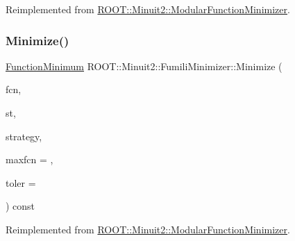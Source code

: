 Reimplemented from \mbox{\hyperlink{classROOT_1_1Minuit2_1_1ModularFunctionMinimizer_a1ae6ed90bc87c3db98388f3d26980a51}{R\+O\+O\+T\+::\+Minuit2\+::\+Modular\+Function\+Minimizer}}.

\mbox{\label{classROOT_1_1Minuit2_1_1FumiliMinimizer_a3da0ec7b2ba7f876809f72d2f3054eec}} 
\subsubsection{\texorpdfstring{Minimize()}{Minimize()}\hspace{0.1cm}{\footnotesize\ttfamily [2/22]}}
{\footnotesize\ttfamily \mbox{\hyperlink{classROOT_1_1Minuit2_1_1FunctionMinimum}{Function\+Minimum}} R\+O\+O\+T\+::\+Minuit2\+::\+Fumili\+Minimizer\+::\+Minimize (\begin{DoxyParamCaption}\item[{const \mbox{\hyperlink{classROOT_1_1Minuit2_1_1FCNBase}{F\+C\+N\+Base}} \&}]{fcn,  }\item[{const \mbox{\hyperlink{classROOT_1_1Minuit2_1_1MnUserParameterState}{Mn\+User\+Parameter\+State}} \&}]{st,  }\item[{const \mbox{\hyperlink{classROOT_1_1Minuit2_1_1MnStrategy}{Mn\+Strategy}} \&}]{strategy,  }\item[{unsigned int}]{maxfcn = {},  }\item[{double}]{toler = {} }\end{DoxyParamCaption}) const\hspace{0.3cm}{\ttfamily [virtual]}}



Reimplemented from \mbox{\hyperlink{classROOT_1_1Minuit2_1_1ModularFunctionMinimizer_a1ae6ed90bc87c3db98388f3d26980a51}{R\+O\+O\+T\+::\+Minuit2\+::\+Modular\+Function\+Minimizer}}.

